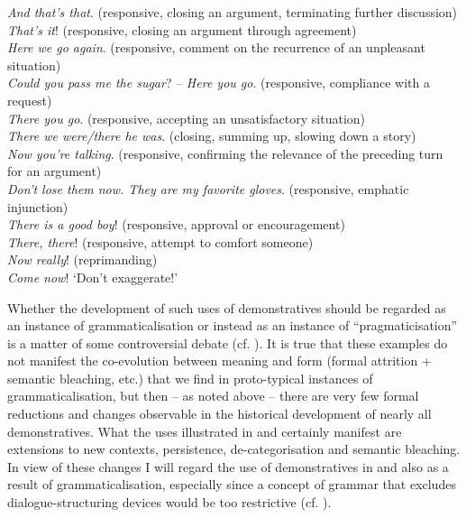 \documentclass[output=paper,colorlinks,citecolor=brown]{langscibook}
\begin{document}
\ex \textit{And that’s that}. \newline (responsive, closing an argument, terminating further discussion)\\

\ex \textit{That’s it}! (responsive, closing an argument through agreement)\\

\ex \textit{Here we go again}. \newline (responsive, comment on the recurrence of an unpleasant situation)\\

\ex \textit{Could you pass me the sugar}? – \textit{Here you go}. \newline (responsive, compliance with a request)\\

\ex \textit{There you go}. (responsive, accepting an unsatisfactory situation)\\

\ex \textit{There we were/there he was}. \newline (closing, summing up, slowing down a story)\\

\ex \textit{Now you’re talking}. (responsive, confirming the relevance of the preceding turn for an argument)\\

\ex \textit{Don’t lose them now. They are my favorite gloves}. \newline (responsive, emphatic injunction)\\

\ex \textit{There is a good boy}! (responsive, approval or encouragement)\\

\ex \textit{There, there}! (responsive, attempt to comfort someone)\\

\ex \textit{Now really}! (reprimanding)\\

\ex \textit{Come now}! ‘Don’t exaggerate!’\\
\z
\z

Whether the development of such uses of demonstratives should be regarded as an instance of grammaticalisation or instead as an instance of “pragmaticisation” is a matter of some controversial debate (cf. \citealt{Diewald2011,Wiese2011,DegandEvers-Vermeul2015}). It is true that these examples do not manifest the co-evolution between meaning and form (formal attrition + semantic bleaching, etc.) that we find in proto-typical instances of grammaticalisation, but then – as noted above – there are very few formal reductions and changes observable in the historical development of nearly all demonstratives. What the uses illustrated in  and  certainly manifest are extensions to new contexts, persistence, de-categorisation and semantic bleaching. In view of these changes I will regard the use of demonstratives in  and  also as a result of grammaticalisation, especially since a concept of grammar that excludes dialogue-structuring devices would be too restrictive (cf. \citealt[74]{DegandEvers-Vermeul2015}).
\end{document}
